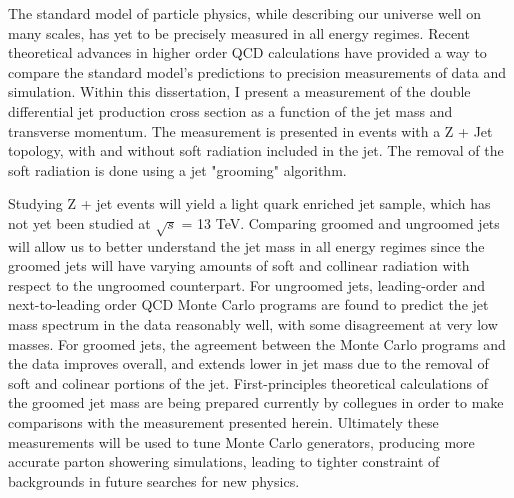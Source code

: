 
The standard model of particle physics, while describing our universe well on many scales, has yet to be precisely measured in all energy regimes. Recent theoretical advances in higher order QCD calculations have provided a way to compare the standard model's predictions to precision measurements of data and simulation. Within this dissertation, I present a measurement of the double differential jet production cross section as a function of the jet mass and transverse momentum. The measurement is presented in events with a Z + Jet topology, with and without soft radiation included in the jet. The removal of the soft radiation is done using a jet "grooming" algorithm.

Studying Z + jet events will yield a light quark enriched jet sample, which has not yet been studied at $\sqrt{s}$ = 13 TeV. Comparing groomed and ungroomed jets will allow us to better understand the jet mass in all energy regimes since the groomed jets will have varying amounts of soft and collinear radiation with respect to the ungroomed counterpart. For ungroomed jets, leading-order and next-to-leading order QCD Monte Carlo programs are found to predict the jet mass spectrum in the data reasonably well, with some disagreement at very low masses. For groomed jets, the agreement between the Monte Carlo programs and the data improves overall, and extends lower in jet mass due to the removal of soft and colinear portions of the jet. First-principles theoretical calculations of the groomed jet mass are being prepared currently by collegues in order to make comparisons with the measurement presented herein. Ultimately these measurements will be used to tune Monte Carlo generators, producing more accurate parton showering simulations, leading to tighter constraint of backgrounds in future searches for new physics.
